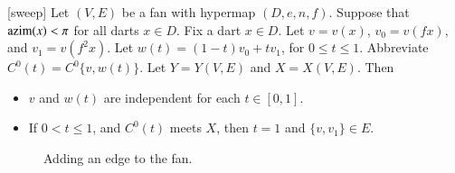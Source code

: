\begin{lemma}[sweep]\label{lemma:sweep}  
Let $(V,E)$ be a fan with hypermap $(D,e,n,f)$.  
Suppose that ${\operatorname{azim}}(x)<\pi$
for all darts $x\in D$.  Fix a dart $x\in D$.
Let $v = v(x)$, $v_0 = v(f x)$,
and $v_1 = v(f^2 x)$.  Let $w(t) = (1-t) v_0 + t v_1$, for
$0\le t\le 1$.  Abbreviate $C^0(t) = C^0\{v,w(t)\}$.
Let $Y = Y(V,E)$ and $X = X(V,E)$.
Then
\begin{itemize}
\item $v$ and $w(t)$ are independent for each $t\in[0,1]$.
\item If $0 < t \le 1$, and $C^0(t)$ meets $X$, then $t=1$ and $\{v,v_1\}\in E$.
\end{itemize}
\end{lemma}


\begin{figure}[htb]
  \centering
  \caption{Adding an edge to the fan.}
  \label{fig:vt}
\end{figure}


